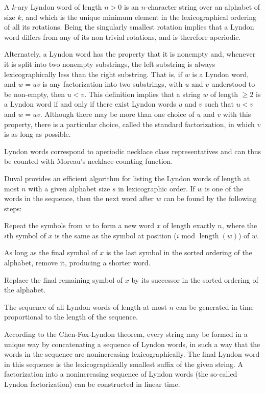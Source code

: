 A $k$-ary Lyndon word of length $n > 0$ is an $n$-character string over an alphabet of size $k$, and which is the unique minimum element in the lexicographical ordering of all its rotations. Being the singularly smallest rotation implies that a Lyndon word differs from any of its non-trivial rotations, and is therefore aperiodic.

Alternately, a Lyndon word has the property that it is nonempty and, whenever it is split into two nonempty substrings, the left substring is always lexicographically less than the right substring. That is, if $w$ is a Lyndon word, and $w = uv$ is any factorization into two substrings, with $u$ and $v$ understood to be non-empty, then $u < v$. This definition implies that a string $w$ of length $\ge 2$ is a Lyndon word if and only if there exist Lyndon words $u$ and $v$ such that $u < v$ and $w = uv$. Although there may be more than one choice of $u$ and $v$ with this property, there is a particular choice, called the standard factorization, in which $v$ is as long as possible.

Lyndon words correspond to aperiodic necklace class representatives and can thus be counted with Moreau's necklace-counting function.

Duval provides an efficient algorithm for listing the Lyndon words of length at most $n$ with a given alphabet size $s$ in lexicographic order. If $w$ is one of the words in the sequence, then the next word after $w$ can be found by the following steps:

\begin{compactenum}
\item Repeat the symbols from $w$ to form a new word $x$ of length exactly $n$, where the $i$th symbol of $x$ is the same as the symbol at position ($i$ mod $\operatorname{length}(w)$) of $w$.
\item As long as the final symbol of $x$ is the last symbol in the sorted ordering of the alphabet, remove it, producing a shorter word.
\item Replace the final remaining symbol of $x$ by its successor in the sorted ordering of the alphabet.
\end{compactenum}

The sequence of all Lyndon words of length at most $n$ can be generated in time proportional to the length of the sequence.

According to the Chen-Fox-Lyndon theorem, every string may be formed in a unique way by concatenating a sequence of Lyndon words, in such a way that the words in the sequence are nonincreasing lexicographically. The final Lyndon word in this sequence is the lexicographically smallest suffix of the given string. A factorization into a nonincreasing sequence of Lyndon words (the so-called Lyndon factorization) can be constructed in linear time.

